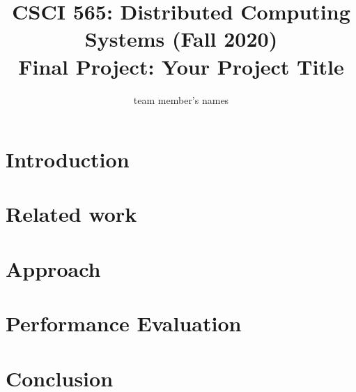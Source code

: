 \documentclass[11pt]{article}
\title{{\normalsize CSCI 565: Distributed Computing Systems (Fall 2020)}\\Final Project: Your Project Title}
\author{team member's names}
\begin{document}
\maketitle

\section{Introduction}
\section{Related work}
  
\section{Approach} %
\section{Performance Evaluation}
    
\section{Conclusion} 



\end{document}
